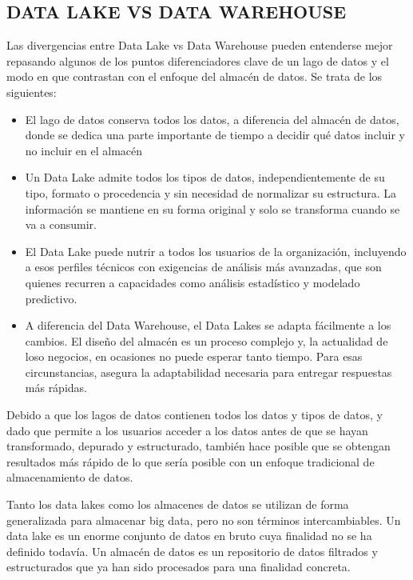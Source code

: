 \documentclass[preprint,12pt]{elsarticle}
\begin{document}
\subsection{DATA LAKE VS DATA WAREHOUSE}
	
Las divergencias entre Data Lake vs Data Warehouse pueden entenderse mejor repasando algunos de los puntos diferenciadores clave de un lago de datos y el modo en que contrastan con el enfoque del almacén de datos. Se trata de los siguientes:\\

\begin{itemize}

\item El lago de datos conserva todos los datos, a diferencia del almacén de datos, donde se dedica una parte importante de tiempo a decidir qué datos incluir y no incluir en el almacén
\item Un Data Lake admite todos los tipos de datos, independientemente de su tipo, formato o procedencia y sin necesidad de normalizar su estructura. La información se mantiene en su forma original y solo se transforma cuando se va a consumir.
\item El Data Lake puede nutrir a todos los usuarios de la organización, incluyendo a esos perfiles técnicos con exigencias de análisis más avanzadas, que son quienes recurren a capacidades como análisis estadístico y modelado predictivo.
\item A diferencia del Data Warehouse, el Data Lakes se adapta fácilmente a los cambios. El diseño del almacén es un proceso complejo y, la actualidad de loso negocios, en ocasiones no puede esperar tanto tiempo. Para esas circunstancias, asegura la adaptabilidad necesaria para entregar respuestas más rápidas.\\
\end{itemize}

Debido a que los lagos de datos contienen todos los datos y tipos de datos, y dado que permite a los usuarios acceder a los datos antes de que se hayan transformado, depurado y estructurado, también hace posible que se obtengan resultados más rápido de lo que sería posible con un enfoque tradicional de almacenamiento de datos.

Tanto los data lakes como los almacenes de datos se utilizan de forma generalizada para almacenar big data, pero no son términos intercambiables. Un data lake es un enorme conjunto de datos en bruto cuya finalidad no se ha definido todavía. Un almacén de datos es un repositorio de datos filtrados y estructurados que ya han sido procesados para una finalidad concreta.
\end{document}
